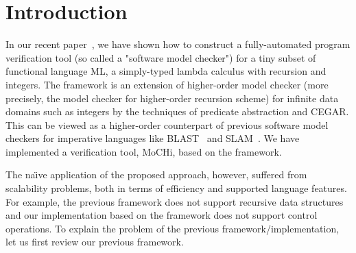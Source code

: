 \section{Introduction}
\label{sec:intro}

In our recent paper~\cite{KobayashiPLDI2011}, we have shown how to
construct a fully-automated program verification tool (so called a
"software model checker") for a tiny subset of functional language ML, a
simply-typed lambda calculus with recursion and integers.
The framework is an extension of higher-order model checker
(more precisely, the model checker for higher-order recursion scheme)
for infinite data domains such as integers by the techniques of
predicate abstraction and CEGAR.  This can be viewed as a higher-order
counterpart of previous software model checkers for imperative languages
like BLAST~\cite{Henzinger2002} and SLAM~\cite{Ball2002}.
We have implemented a verification tool, MoCHi, based on the framework.

The na\"{\i}ve application of the proposed approach, however, suffered
from scalability problems, both in terms of efficiency and supported
language features. For example, the previous framework does not support
recursive data structures and our implementation based on the framework
does not support control operations.  To explain the problem of the
previous framework/implementation, let us first review our previous
framework.

